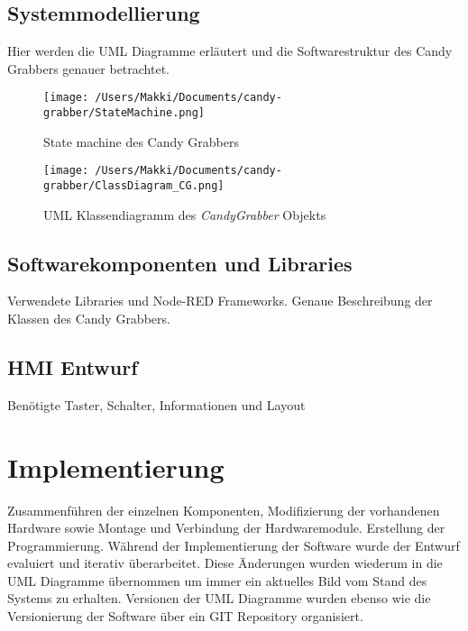 \documentclass[BMR,Bachelor,ngerman]{twbook}%
\begin{document}
\subsection{Systemmodellierung}
Hier werden die UML Diagramme erläutert und die Softwarestruktur des Candy Grabbers genauer betrachtet.
\begin{figure}[!htbp]
\centering
\texttt{[image: /Users/Makki/Documents/candy-grabber/StateMachine.png]}
\caption{State machine des Candy Grabbers}
\end{figure}
%
%
\begin{figure}[!htbp]
\centering
\texttt{[image: /Users/Makki/Documents/candy-grabber/ClassDiagram\_CG.png]}
\caption{UML Klassendiagramm des \emph{CandyGrabber} Objekts}
\end{figure}
%
\subsection{Softwarekomponenten und Libraries}
Verwendete Libraries und Node-RED Frameworks. Genaue Beschreibung der Klassen des Candy Grabbers.
%
\subsection{HMI Entwurf}
Benötigte Taster, Schalter, Informationen und Layout
\section{Implementierung}
Zusammenführen der einzelnen Komponenten, Modifizierung der vorhandenen Hardware sowie Montage und Verbindung der Hardwaremodule. Erstellung der Programmierung. Während der Implementierung der Software wurde der Entwurf evaluiert und iterativ überarbeitet. Diese Änderungen wurden wiederum in die UML Diagramme übernommen um immer ein aktuelles Bild vom Stand des Systems zu erhalten. Versionen der UML Diagramme wurden ebenso wie die Versionierung der Software über ein GIT Repository organisiert.
%
\end{document}
